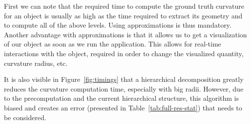 \documentclass{llncs}
\begin{document}

First we can note that the required time to
compute the ground truth curvature for an object is usually as high as the time
required to extract its geometry and to compute all of the above
levels. Using approximations is thus mandatory.  Another advantage
with approximations is that it allows us to get a visualization of
our object as soon as we run the application. This allows for
real-time interactions with the object, required in order to change
the visualized quantity, curvature radius, etc.

It is also visible in Figure~\ref{fig:timings} that a hierarchical decomposition greatly reduces the curvature computation
time, especially with big radii.
However, due to the precomputation and the current hierarchical
structure, this algorithm is biased and creates an error (presented in
Table~\ref{tab:full-res-stat}) that needs to be considered.
\end{document}

